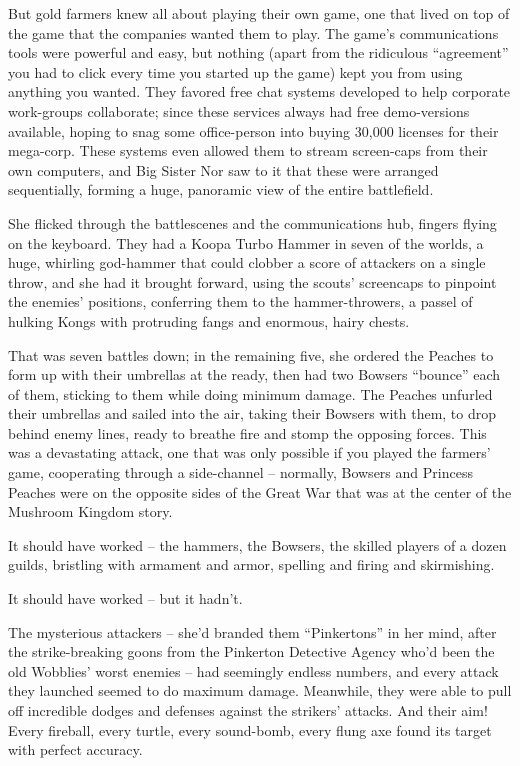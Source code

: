 But gold farmers knew all about playing their own game, one that
lived on top of the game that the companies wanted them to play.
The game's communications tools were powerful and easy, but nothing
(apart from the ridiculous ``agreement'' you had to click every time
you started up the game) kept you from using anything you wanted.
They favored free chat systems developed to help corporate
work-groups collaborate; since these services always had free
demo-versions available, hoping to snag some office-person into
buying 30,000 licenses for their mega-corp. These systems even
allowed them to stream screen-caps from their own computers, and
Big Sister Nor saw to it that these were arranged sequentially,
forming a huge, panoramic view of the entire battlefield.

She flicked through the battlescenes and the communications hub,
fingers flying on the keyboard. They had a Koopa Turbo Hammer in
seven of the worlds, a huge, whirling god-hammer that could clobber
a score of attackers on a single throw, and she had it brought
forward, using the scouts' screencaps to pinpoint the enemies'
positions, conferring them to the hammer-throwers, a passel of
hulking Kongs with protruding fangs and enormous, hairy chests.

That was seven battles down; in the remaining five, she ordered the
Peaches to form up with their umbrellas at the ready, then had two
Bowsers ``bounce'' each of them, sticking to them while doing minimum
damage. The Peaches unfurled their umbrellas and sailed into the
air, taking their Bowsers with them, to drop behind enemy lines,
ready to breathe fire and stomp the opposing forces. This was a
devastating attack, one that was only possible if you played the
farmers' game, cooperating through a side-channel -- normally,
Bowsers and Princess Peaches were on the opposite sides of the
Great War that was at the center of the Mushroom Kingdom story.

It should have worked -- the hammers, the Bowsers, the skilled
players of a dozen guilds, bristling with armament and armor,
spelling and firing and skirmishing.

It should have worked -- but it hadn't.

The mysterious attackers -- she'd branded them ``Pinkertons'' in her
mind, after the strike-breaking goons from the Pinkerton Detective
Agency who'd been the old Wobblies' worst enemies -- had seemingly
endless numbers, and every attack they launched seemed to do
maximum damage. Meanwhile, they were able to pull off incredible
dodges and defenses against the strikers' attacks. And their aim!
Every fireball, every turtle, every sound-bomb, every flung axe
found its target with perfect accuracy.

